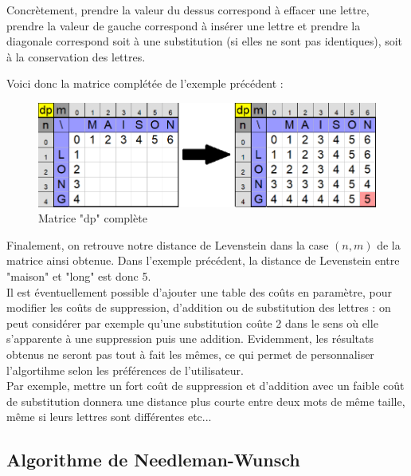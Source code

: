\documentclass[12pt]{article}
\begin{document}
Concrètement, prendre la valeur du dessus correspond à effacer une lettre, prendre la valeur de gauche correspond à insérer une lettre et prendre la diagonale correspond soit à une substitution (si elles ne sont pas identiques), soit à la conservation des lettres.\\

\newpage

Voici donc la matrice complétée de l'exemple précédent :

\begin{figure}[!h]
    \centering
    \includegraphics[scale = 0.69]{Images/Levenstein/levenstein rempli.png}
    \caption{Matrice "dp" complète}
    \label{fig:Matrice "dp" complète}
\end{figure}

Finalement, on retrouve notre distance de Levenstein dans la case $(n,m)$ de la matrice ainsi obtenue. Dans l'exemple précédent, la distance de Levenstein entre "maison" et "long" est donc 5.\\

Il est éventuellement possible d'ajouter une table des coûts en paramètre, pour modifier les coûts de suppression, d'addition ou de substitution des lettres : on peut considérer par exemple qu'une substitution coûte 2 dans le sens où elle s'apparente à une suppression puis une addition. Evidemment, les résultats obtenus ne seront pas tout à fait les mêmes, ce qui permet de personnaliser l'algortihme selon les préférences de l'utilisateur.\\
Par exemple, mettre un fort coût de suppression et d'addition avec un faible coût de substitution donnera une distance plus courte entre deux mots de même taille, même si leurs lettres sont différentes etc...



\subsection{Algorithme de Needleman-Wunsch}
\label{subsec:algo_nw} 
\end{document}
